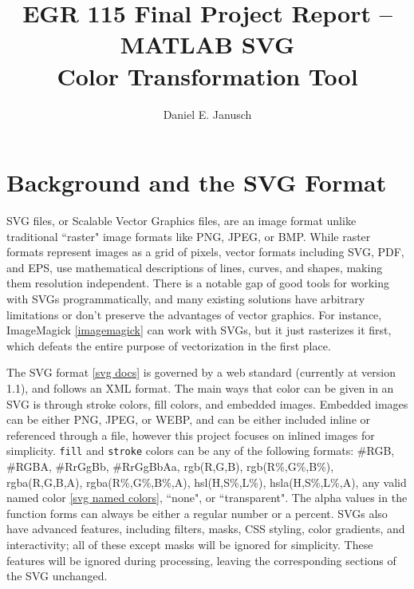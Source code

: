 \documentclass[12pt]{article}
\newcommand \iindent  {\indent \indent}
\newcommand \iiindent {\indent \iindent}
\begin{document}

\title{EGR 115 Final Project Report {\bf–} MATLAB SVG\\Color Transformation Tool}
\author{Daniel E. Janusch}
\maketitle

\section{Background and the SVG Format}

\iiindent SVG files, or Scalable Vector Graphics files, are an image format unlike
traditional ``raster" image formats like PNG, JPEG, or BMP. While raster formats
represent images as a grid of pixels, vector formats including SVG, PDF, and EPS,
use mathematical descriptions of lines, curves, and shapes, making them resolution
independent. There is a notable gap of good tools for working with SVGs
programmatically, and many existing solutions have arbitrary limitations or don't
preserve the advantages of vector graphics. For instance, ImageMagick \ref{imagemagick}
can work with SVGs, but it just rasterizes it first, which defeats the entire purpose
of vectorization in the first place.
\vspace{5px}

\iindent The SVG format \ref{svg docs} is governed by a web standard (currently at
version 1.1), and follows an XML format. The main ways that color can be given in an
SVG is through stroke colors, fill colors, and embedded images. Embedded images can be
either PNG, JPEG, or WEBP, and can be either included inline or referenced through a
file, however this project focuses on inlined images for simplicity. \texttt{fill} and
\texttt{stroke} colors can be any of the following formats: \#RGB, \#RGBA, \#RrGgBb,
\#RrGgBbAa, rgb(R,G,B), rgb(R\%,G\%,B\%), rgba(R,G,B,A), rgba(R\%,G\%,B\%,A),
hsl(H,S\%,L\%), hsla(H,S\%,L\%,A), any valid named color \ref{svg named colors},
``none", or ``transparent". The alpha values in the function forms can always be
either a regular number or a percent. SVGs also have advanced features, including
filters, masks, CSS styling, color gradients, and interactivity; all of these except
masks will be ignored for simplicity. These features will be ignored during
processing, leaving the corresponding sections of the SVG unchanged.
\end{document}
